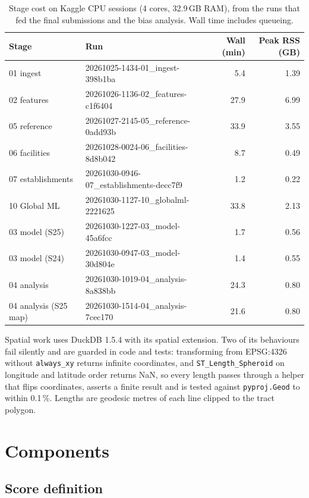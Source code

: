 \documentclass[11pt]{article}
\begin{document}
\begin{table}[htbp]
\centering
\small
\caption{Stage cost on Kaggle CPU sessions (4 cores, 32.9\,GB RAM), from the
runs that fed the final submissions and the bias analysis. Wall time includes
queueing.}
\label{tab:stages}
\begin{tabular}{llrr}
\toprule
Stage & Run & Wall (min) & Peak RSS (GB) \\
\midrule
01 ingest & 20261025-1434-01\_ingest-398b1ba & 5.4 & 1.39 \\
02 features & 20261026-1136-02\_features-c1f6404 & 27.9 & 6.99 \\
05 reference & 20261027-2145-05\_reference-0add93b & 33.9 & 3.55 \\
06 facilities & 20261028-0024-06\_facilities-8d8b042 & 8.7 & 0.49 \\
07 establishments & 20261030-0946-07\_establishments-decc7f9 & 1.2 & 0.22 \\
10 Global ML & 20261030-1127-10\_globalml-2221625 & 33.8 & 2.13 \\
03 model (S25) & 20261030-1227-03\_model-45a6fcc & 1.7 & 0.56 \\
03 model (S24) & 20261030-0947-03\_model-30d804e & 1.4 & 0.55 \\
04 analysis & 20261030-1019-04\_analysis-8a838bb & 24.3 & 0.80 \\
04 analysis (S25 map) & 20261030-1514-04\_analysis-7cec170 & 21.6 & 0.80 \\
\bottomrule
\end{tabular}
\end{table}

Spatial work uses DuckDB 1.5.4 with its spatial extension. Two of its
behaviours fail silently and are guarded in code and tests: transforming from
EPSG:4326 without \texttt{always\_xy} returns infinite coordinates, and
\texttt{ST\_Length\_Spheroid} on longitude and latitude order returns NaN, so
every length passes through a helper that flips coordinates, asserts a finite
result and is tested against \texttt{pyproj.Geod} to within 0.1\,\%. Lengths
are geodesic metres of each line clipped to the tract polygon.

\section{Components}
\label{sec:components}

\subsection{Score definition}
\end{document}

